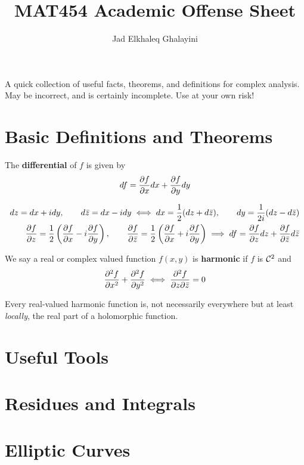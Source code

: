 \documentclass{article}
\title{MAT454 Academic Offense Sheet}
\author{Jad Elkhaleq Ghalayini}
\begin{document}
\maketitle

A quick collection of useful facts, theorems, and definitions for complex analysis. May be incorrect, and is certainly incomplete. Use at your own risk!

\tableofcontents

\newpage

\section{Basic Definitions and Theorems}
\begin{definition}
The \textbf{differential} of \(f\) is given by
\begin{equation}
  df = {\frac{\partial {f}}{\partial {x}}}dx + {\frac{\partial {f}}{\partial {y}}}dy
\end{equation}
\end{definition}
\begin{align}
  dz = dx + idy, \qquad d\bar{z} = dx - idy \iff
  dx = \frac{1}{2}(dz + d\bar{z}), \qquad dy = \frac{1}{2i}(dz - d\bar{z}) \\
  {\frac{\partial {f}}{\partial {z}}} = \frac{1}{2}\left({\frac{\partial {f}}{\partial {x}}} - i{\frac{\partial {f}}{\partial {y}}}\right),
    \qquad {\frac{\partial {f}}{\partial {\bar{z}}}}
    = \frac{1}{2}\left({\frac{\partial {f}}{\partial {x}}} + i{\frac{\partial {f}}{\partial {y}}}\right)
    \implies df = {\frac{\partial {f}}{\partial {z}}}dz + {\frac{\partial {f}}{\partial {\bar{z}}}}d\bar{z}
\end{align}
\begin{definition}[Harmonic]
We say a real or complex valued function \(f(x, y)\) is \textbf{harmonic} if \(f\) is \(\mathcal{C}^2\) and
\begin{equation}
  {\frac{\partial {^2f}}{\partial {x^2}}} + {\frac{\partial {^2f}}{\partial {y^2}}} \iff {\frac{\partial {^2f}}{\partial {z\partial\bar{z}}}} = 0\end{equation}
\end{definition}
\begin{proposition}
  Every real-valued harmonic function is, not necessarily everywhere but at least \textit{locally}, the real part of a holomorphic function.
\end{proposition}

\section{Useful Tools}

\section{Residues and Integrals}

\section{Elliptic Curves}
\end{document}
